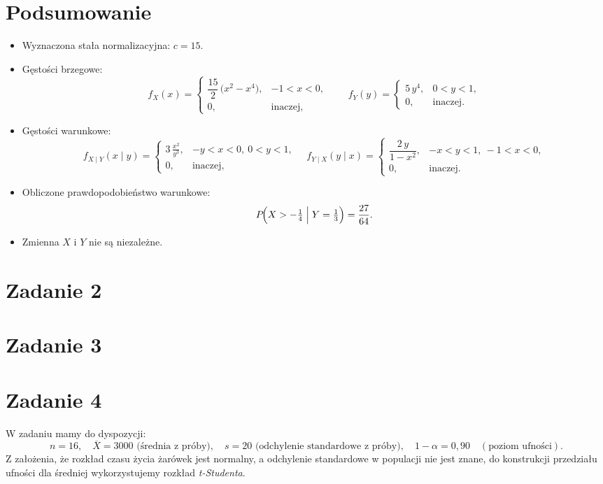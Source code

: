 \documentclass[polish, 8pt]{article}
\begin{document}
\section*{Podsumowanie}
\begin{itemize}
\item Wyznaczona stała normalizacyjna: \(\displaystyle c = 15\).
\item Gęstości brzegowe:
\[
f_X(x) 
= 
\begin{cases}
\dfrac{15}{2}\,\bigl(x^2 - x^4\bigr), & -1<x<0,\\[6pt]
0, & \text{inaczej},
\end{cases}
\qquad
f_Y(y) 
= 
\begin{cases}
5\,y^4, & 0<y<1,\\
0, & \text{inaczej}.
\end{cases}
\]
\item Gęstości warunkowe:
\[
f_{X \mid Y}(x\mid y) = 
\begin{cases}
3\,\frac{x^2}{y^3}, & -y<x<0,\ 0<y<1,\\
0, & \text{inaczej},
\end{cases}
\quad
f_{Y \mid X}(y\mid x) = 
\begin{cases}
\dfrac{2\,y}{1 - x^2}, & -x<y<1,\ -1<x<0,\\
0, & \text{inaczej}.
\end{cases}
\]
\item Obliczone prawdopodobieństwo warunkowe:
\[
P\!\Bigl(X > -\tfrac14 \;\Big\vert\; Y=\tfrac13\Bigr) 
= \frac{27}{64}.
\]
\item Zmienna \(X\) i \(Y\) nie są niezależne.
\end{itemize}


\section*{Zadanie 2}

\section*{Zadanie 3}

\section*{Zadanie 4}
W zadaniu mamy do dyspozycji:
\[
n = 16,\quad
\overline{X} = 3000 \text{ (średnia z próby)},\quad
s = 20 \text{ (odchylenie standardowe z próby)},\quad
1 - \alpha = 0{,}90 \quad (\text{poziom ufności}).
\]
Z założenia, że rozkład czasu życia żarówek jest normalny, a odchylenie standardowe w populacji nie jest znane, do konstrukcji przedziału ufności dla średniej wykorzystujemy rozkład \emph{t-Studenta}.
\end{document}
